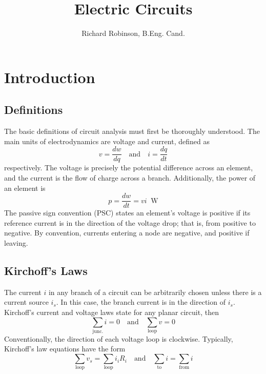 \documentclass[oneside, 11pt]{book}
\title{\Huge{\textbf{Electric Circuits}}}
\author{Richard Robinson, B.Eng. Cand.}
\begin{document}
\maketitle
\tableofcontents
\setlength{\parindent}{0pt}

\chapter{Introduction}

\section{Definitions}
The basic definitions of circuit analysis must first be thoroughly understood. The main units of electrodynamics are voltage and current, defined as \begin{equation}
    v = \frac{dw}{dq} \quad\text{and}\quad i = \frac{dq}{dt}
\end{equation}
respectively. The voltage is precisely the potential difference across an element, and the current is the flow of charge across a branch. Additionally, the power of an element is \begin{equation}
    p = \frac{dw}{dt} = vi \;\;\text{W}
\end{equation}
The passive sign convention (PSC) states an element's voltage is positive if its reference current is in the direction of the voltage drop; that is, from positive to negative. By convention, currents entering a node are negative, and positive if leaving.

\section{Kirchoff's Laws}
The current $i$ in any branch of a circuit can be arbitrarily chosen unless there is a current source $i_s$. In this case, the branch current is in the direction of $i_s$. Kirchoff's current and voltage laws state for any planar circuit, then
\begin{equation}
    \sum_{\text{junc.}} i = 0 \quad\text{and}\quad \sum_{\text{loop}} v = 0
\end{equation}
Conventionally, the direction of each voltage loop is clockwise. Typically, Kirchoff's law equations have the form \begin{equation}
    \sum_{\text{loop}} v_s = \sum_{\text{loop}} i_iR_i \quad\text{and}\quad \sum_{\text{to}} i = \sum_{\text{from}} i
\end{equation}
\end{document}
